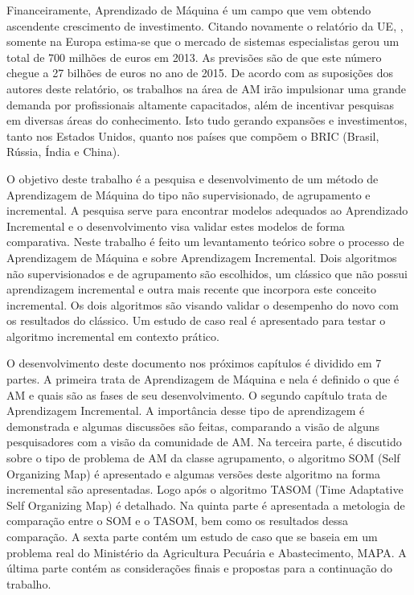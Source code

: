 Financeiramente, Aprendizado de Máquina é um campo que vem obtendo ascendente crescimento de investimento. Citando novamente o relatório da UE, , somente na Europa estima-se que o mercado de sistemas especialistas gerou um total de 700 milhões de euros em 2013. As previsões são de que este número chegue a 27 bilhões de euros no ano de 2015. De acordo com as suposições dos autores deste relatório, os trabalhos na área de AM irão impulsionar uma grande demanda por profissionais altamente capacitados, além de incentivar pesquisas em diversas áreas do conhecimento. Isto tudo gerando expansões e investimentos, tanto nos Estados Unidos, quanto nos países que compõem o BRIC (Brasil, Rússia, Índia e China). 

O objetivo deste trabalho é a pesquisa e desenvolvimento de um método de Aprendizagem de Máquina do tipo não supervisionado, de agrupamento e incremental. A pesquisa serve para encontrar modelos adequados ao Aprendizado Incremental e o desenvolvimento visa validar estes modelos de forma comparativa. Neste trabalho é feito um levantamento teórico sobre o processo de Aprendizagem de Máquina e sobre Aprendizagem Incremental. Dois algoritmos não supervisionados e de agrupamento são escolhidos, um clássico que não possui aprendizagem incremental e outra mais recente que incorpora este conceito incremental. Os dois algoritmos são visando validar o desempenho do novo com os resultados do clássico. Um estudo de caso real é apresentado para testar o algoritmo incremental em contexto prático.

O desenvolvimento deste documento nos próximos capítulos é dividido em 7 partes. A primeira  trata de Aprendizagem de Máquina e nela é definido o que é AM e quais são as fases de seu desenvolvimento. O segundo capítulo trata de Aprendizagem Incremental. A importância desse tipo de aprendizagem é demonstrada e algumas discussões são feitas, comparando a visão de alguns pesquisadores com a visão da comunidade de AM. Na terceira parte, é discutido sobre o tipo de problema de AM da classe agrupamento, o algoritmo SOM (Self Organizing Map) é apresentado e algumas versões deste algoritmo na forma incremental são apresentadas. Logo após o algoritmo TASOM (Time Adaptative Self Organizing Map) é detalhado. Na quinta parte é apresentada a metologia de comparação entre o SOM e o TASOM, bem como os resultados dessa comparação. A sexta parte contém um estudo de caso que se baseia em um problema real do Ministério da Agricultura Pecuária e Abastecimento, MAPA. A última parte contém as considerações finais e propostas para a continuação do trabalho.





